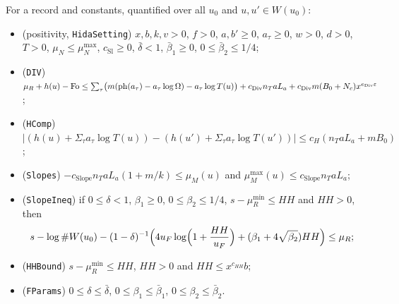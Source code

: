 \begin{definition}\label{geoa:clauses}
For a record and constants, quantified over all $u_0$ and $u,u'\in W(u_0)$:
\begin{itemize}
\item (positivity, \texttt{HidaSetting}) $x,b,k,v>0$, $f>0$, $a,b'\ge0$, $a_{\tau}\ge0$,
$w>0$, $d>0$, $T>0$, $\mu_N\le\mu_N^{\max}$, $c_{\mathrm{Sl}}\ge0$, $\bar\delta<1$,
$\bar\beta_1\ge0$, $0\le\bar\beta_2\le1/4$;
\item (\texttt{DIV}) $\mu_R+h(u)-\mathrm{Fo}\le\sum_{\tau}\bigl(m(\operatorname{ph}(a_{\tau})
-a_{\tau}\log\Omega)-a_{\tau}\log T(u)\bigr)+c_{\mathrm{Div}}n_TaL_a
+c_{\mathrm{Div}}m(B_0+N_c)x^{e_{\mathrm{Div}}\varepsilon}$;
\item (\texttt{HComp}) $\bigl|(h(u)+\Sigma_{\tau} a_{\tau}\log T(u))-(h(u')+\Sigma_{\tau}
a_{\tau}\log T(u'))\bigr|\le c_H(n_TaL_a+mB_0)$;
\item (\texttt{Slopes}) $-c_{\mathrm{Slope}}n_TaL_a(1+m/k)\le\mu_M(u)$ and
$\mu_M^{\max}(u)\le c_{\mathrm{Slope}}n_TaL_a$;
\item (\texttt{SlopeIneq}) if $0\le\delta<1$, $\beta_1\ge0$, $0\le\beta_2\le1/4$,
$s-\mu_R^{\min}\le HH$ and $HH>0$, then
\[
s-\log\#W(u_0)-(1-\delta)^{-1}\Bigl(4u_F\log\Bigl(1+\frac{HH}{u_F}\Bigr)
+(\beta_1+4\sqrt{\beta_2})HH\Bigr)\le\mu_R;
\]
\item (\texttt{HHBound}) $s-\mu_R^{\min}\le HH$, $HH>0$ and $HH\le x^{c_{HH}}b$;
\item (\texttt{FParams}) $0\le\delta\le\bar\delta$, $0\le\beta_1\le\bar\beta_1$,
$0\le\beta_2\le\bar\beta_2$.
\end{itemize}
\end{definition}

